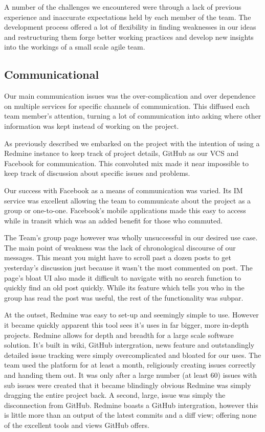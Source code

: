 \documentclass{l3proj}
\begin{document}
A number of the challenges we encountered were through a lack of previous
experience and inaccurate expectations held by each member of the team. The
development process offered a lot of flexibility in finding weaknesses in our
ideas and restructuring them forge better working practices and develop new
insights into the workings of a small scale agile team.

\subsection{Communicational}
Our main communication issues was the over-complication and over dependence on multiple services for specific channels of communication. This diffused each team member's attention, turning a lot of communication into asking where other information was kept instead of working on the project.

As previously described we embarked on the project with the intention of using a Redmine instance to keep track of project details, GitHub as our VCS and Facebook for communication. This convoluted mix made it near impossible to keep track of discussion about specific issues and problems.

Our success with Facebook as a means of communication was varied. Its IM service was excellent allowing the team to communicate about the project as a group or one-to-one. Facebook's mobile applications made this easy to access while in transit which was an added benefit for those who commuted.

The Team's group page however was wholly unsuccessful in our desired use case. The main point of weakness was the lack of chronological discourse of our messages. This meant you might have to scroll past a dozen posts to get yesterday's discussion just because it wasn't the most commented on post. The page's bloat UI also made it difficult to navigate with no search function to quickly find an old post quickly. While its feature which tells you who in the group has read the post was useful, the rest of the functionality was subpar.

At the outset, Redmine was easy to set-up and seemingly simple to use. However it became quickly apparent this tool sees it's uses in far bigger, more in-depth projects.
Redmine allows for depth and breadth for a large scale software solution. It's built in wiki, GitHub intergration, news feature and outstandingly detailed issue tracking were simply overcomplicated and bloated for our uses.
The team used the platform for at least a month, religiously creating issues correctly and handing them out. It was only after a large number (at least 60) issues with sub issues were created that it became blindingly obvious Redmine was simply dragging the entire project back.
A second, large, issue was simply the disconnection from GitHub. Redmine boasts a GitHub intergration, however this is little more than an output of the latest commits and a diff view; offering none of the excellent tools and views GitHub offers.
\end{document}
